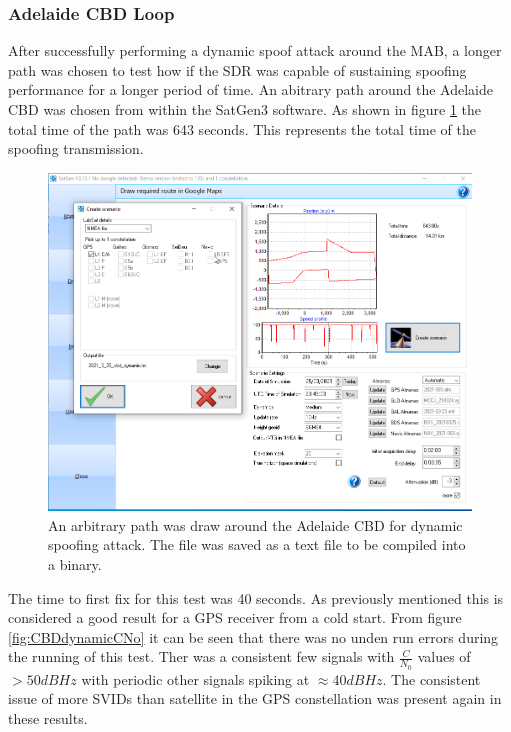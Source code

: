 \subsubsection{Adelaide CBD Loop}
After successfully performing a dynamic spoof attack around the MAB, a longer path was chosen to test how if the SDR was capable of sustaining spoofing performance for a
longer period of time. An abitrary path around the Adelaide CBD was chosen from within the SatGen3 software. As shown in figure \ref{fig:CBDdynamicSetup} the total time of the path was 643 seconds. This represents the total time of the spoofing transmission.

\begin{figure}[!h]
    \begin{centering}
        \includegraphics[width=12cm,keepaspectratio]{Figures/21-3-25_cbd_dynamic_longloop_setup.png}
        \caption{An arbitrary path was draw around the Adelaide CBD for dynamic spoofing attack. The file was saved as a text file to be compiled into a binary.}
        \label{fig:CBDdynamicSetup}
    \end{centering}
\end{figure}

The time to first fix for this test was 40 seconds. As previously mentioned this is considered a good result for a GPS receiver from a cold start. From figure
\ref{fig:CBDdynamicCNo} it can be seen that there was no unden run errors during the running of this test. Ther was a consistent few signals with $\frac{C}{N_0}$ values
of $>50dBHz$ with periodic other signals spiking at $\approx 40dBHz$.
The consistent issue of more SVIDs than satellite in the GPS constellation was present again in these results.

